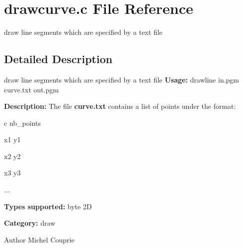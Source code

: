 \section{drawcurve.c File Reference}
\label{drawcurve_8c}


draw line segments which are specified by a text file  




\subsection{Detailed Description}
draw line segments which are specified by a text file {\bfseries Usage:} drawline in.pgm curve.txt out.pgm

{\bfseries Description:} The file {\bfseries curve.txt} contains a list of points under the format:\par
 c nb\_\-points\par
 x1 y1\par
 x2 y2\par
 x3 y3\par
 ...\par


{\bfseries Types supported:} byte 2D

{\bfseries Category:} draw

\begin{DoxyAuthor}{Author}
Michel Couprie 
\end{DoxyAuthor}
